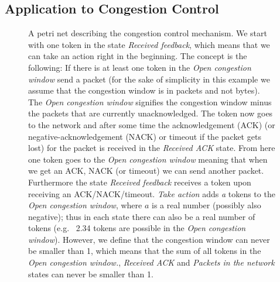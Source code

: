 \documentclass[newfonts=false,format=sigconf,10pt,letterpaper]{acmart}
\newcommand\note[2]{{\color{#1}#2}}
\newcommand\todo[1]{{\note{red}{TODO: #1}}}
\begin{document}
\subsection{Application to Congestion Control}

\begin{figure}



\caption{A petri net describing the congestion control mechanism. We start with one token in the state \textit{Received feedback}, which means that we can take an action right in the beginning. The concept is the following: If there is at least one token in the \textit{Open congestion window} send a packet (for the sake of simplicity in this example we assume that the congestion window is in packets and not bytes). The \textit{Open congestion window} signifies the congestion window minus the packets that are currently unacknowledged. The token now goes to the network and after some time the acknowledgement (ACK) (or negative-acknowledgement (NACK) or timeout if the packet gets lost) for the packet is received in the \textit{Received ACK} state. From here one token goes to the \textit{Open congestion window} meaning that when we get an ACK, NACK (or timeout) we can send another packet. Furthermore the state \textit{Received feedback} receives a token upon receiving an ACK/NACK/timeout. \textit{Take action} adds \textit{a} tokens to the \textit{Open congestion window}, where $a$ is a real number (possibly also negative); thus in each state there can also be a real number of tokens (e.g.~ 2.34 tokens are possible in the \textit{Open congestion window}). However, we define that the congestion window can never be smaller than 1, which means that the sum of all tokens in the \textit{Open congestion window.}, \textit{Received ACK} and \textit{Packets in the network} states can never be smaller than 1.}
\label{fig:petri}
\end{figure}

\end{document}
